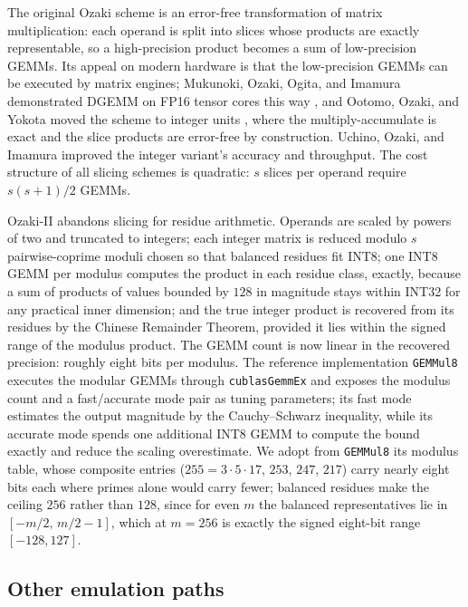 \documentclass[11pt]{amsart}
\theoremstyle{plain}
\theoremstyle{definition}
\newcommand{\code}[1]{\texttt{#1}}
\newcommand{\gemmul}{\code{GEMMul8}}
\begin{document}
The original Ozaki scheme \cite{ozaki2012} is an error-free transformation
of matrix multiplication: each operand is split into slices whose products
are exactly representable, so a high-precision product becomes a sum of
low-precision GEMMs. Its appeal on modern hardware is that the low-precision
GEMMs can be executed by matrix engines; Mukunoki, Ozaki, Ogita, and
Imamura demonstrated DGEMM on FP16 tensor cores this way
\cite{mukunoki2020}, and Ootomo, Ozaki, and Yokota moved the scheme to
integer units \cite{ootomo2024}, where the multiply-accumulate is exact and
the slice products are error-free by construction. Uchino, Ozaki, and
Imamura \cite{uchino2025} improved the integer variant's accuracy and
throughput. The cost structure of all slicing schemes is quadratic: $s$
slices per operand require $s(s+1)/2$ GEMMs.

Ozaki-II \cite{ozaki2scheme} abandons slicing for residue arithmetic.
Operands are scaled by powers of two and truncated to integers; each
integer matrix is reduced modulo $s$ pairwise-coprime moduli chosen so
that balanced residues fit INT8; one INT8 GEMM per modulus computes the
product in each residue class, exactly, because a sum of products of
values bounded by $128$ in magnitude stays within INT32 for any practical
inner dimension; and the true integer product is recovered from its
residues by the Chinese Remainder Theorem, provided it lies within the
signed range of the modulus product. The GEMM count is now linear in the
recovered precision: roughly eight bits per modulus. The reference
implementation \gemmul{} executes the modular GEMMs through
\code{cublasGemmEx} and exposes the modulus count and a fast/accurate mode
pair as tuning parameters; its fast mode estimates the output magnitude by
the Cauchy--Schwarz inequality, while its accurate mode spends one
additional INT8 GEMM to compute the bound exactly and reduce the scaling
overestimate. We adopt from \gemmul{} its modulus table, whose composite
entries ($255 = 3 \cdot 5 \cdot 17$, $253$, $247$, $217$) carry nearly
eight bits each where primes alone would carry fewer; balanced residues
make the ceiling $256$ rather than $128$, since for even $m$ the
balanced representatives lie in $[-m/2,\, m/2 - 1]$, which at $m = 256$
is exactly the signed eight-bit range $[-128, 127]$.

\subsection{Other emulation paths}
\end{document}
